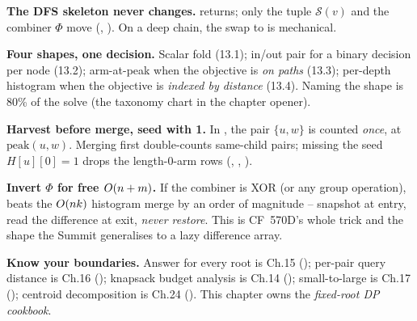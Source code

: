 \begin{quickref}
\textbf{The DFS skeleton never changes.}  returns; only
the tuple $\mathcal S(v)$ and the combiner $\Phi$ move
(, ). On a deep
chain, the swap to  is mechanical.

\medskip
\textbf{Four shapes, one decision.} Scalar fold (13.1); in/out pair for a
binary decision per node (13.2); arm-at-peak when the objective is
\emph{on paths} (13.3); per-depth histogram when the objective is
\emph{indexed by distance} (13.4). Naming the shape is 80\% of the solve
(the taxonomy chart in the chapter opener).

\medskip
\textbf{Harvest before merge, seed with 1.} In , the
pair $\{u,w\}$ is counted \emph{once}, at $\mathrm{peak}(u,w)$. Merging
first double-counts same-child pairs; missing the seed
$\mathit{H}[u][0]=1$ drops the length-$0$-arm rows
(, , ).

\medskip
\textbf{Invert $\Phi$ for free $O(n+m)$.} If the combiner is XOR (or
any group operation),  beats the $O(nk)$
histogram merge by an order of magnitude -- snapshot at entry, read the
difference at exit, \emph{never restore}. This is CF~570D's whole trick
and the shape the Summit generalises to a lazy difference array.

\medskip
\textbf{Know your boundaries.} Answer for every root is Ch.15
(); per-pair query distance is Ch.16 (); knapsack
budget analysis is Ch.14 (); small-to-large is Ch.17
(); centroid decomposition is Ch.24 (). This
chapter owns the \emph{fixed-root DP cookbook}.
\end{quickref}

